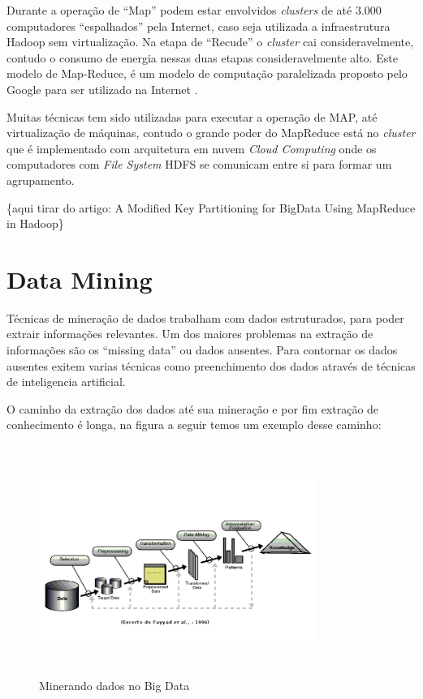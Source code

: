 \documentclass[conference,compsoc]{IEEEtran}
\begin{document}
Durante a operação de ``Map'' podem estar envolvidos \textit{clusters} de até 3.000 computadores ``espalhados'' pela Internet, caso seja utilizada a infraestrutura Hadoop sem virtualização. Na etapa de ``Recude'' o \textit{cluster} cai consideravelmente, contudo o consumo de energia nessas duas etapas consideravelmente alto. \cite{Conejero2015}
Este modelo de Map-Reduce, é um modelo de computação paralelizada proposto pelo Google para ser utilizado na Internet \cite{Dean2008}.

Muitas técnicas tem sido utilizadas para executar a operação de MAP, até virtualização de máquinas, contudo o grande poder do MapReduce está no \textit{cluster} que é implementado com arquitetura em nuvem \textit{Cloud Computing} onde os computadores com \textit{File System} HDFS se comunicam entre si para formar um agrupamento.


\{aqui tirar do artigo: A Modified Key Partitioning for BigData Using MapReduce in Hadoop\}

\section{Data Mining}

Técnicas de mineração de dados trabalham com dados estruturados, para poder extrair informações relevantes.
Um dos maiores problemas na extração de informações são os ``missing data'' ou dados ausentes. Para contornar os dados ausentes exitem varias técnicas como preenchimento dos dados através de técnicas de inteligencia artificial.

O caminho da extração dos dados até sua mineração e por fim extração de conhecimento é longa, na figura a seguir temos um exemplo desse caminho:

\begin{figure}[!ht]
\centering
\caption{Minerando dados no Big Data}
\flushleft
\includegraphics[width=90mm, height=75mm]{Figuras/FayyadSemFundo.png}
\end{figure}
\end{document}
